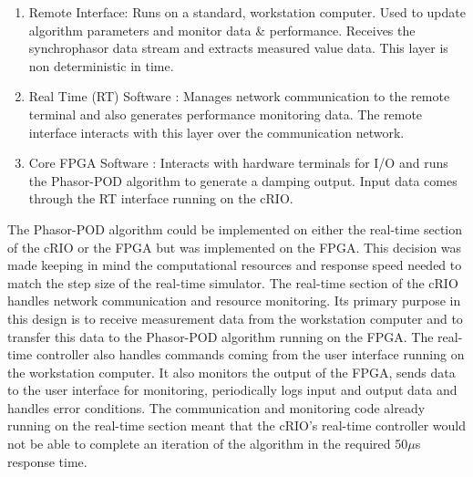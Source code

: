 \documentclass[journal]{IEEEtran}
\begin{document}
\begin{enumerate}
\item Remote Interface: Runs on a standard, workstation computer. Used to update algorithm parameters and monitor data \& performance. Receives the synchrophasor data stream and extracts measured value data. This  layer is non deterministic in time.

\item Real Time (RT) Software : Manages network communication to the remote terminal and also generates performance monitoring data. The remote interface interacts with this layer over the communication network.

\item Core FPGA Software : Interacts with hardware terminals for I/O and runs the Phasor-POD algorithm to generate a damping output. Input data comes through the RT interface running on the cRIO.

\end{enumerate}

The Phasor-POD algorithm could be implemented on either the real-time section of the cRIO or the FPGA but was implemented on the FPGA. This decision was made keeping in mind the computational resources and response speed needed to match the step size of the real-time simulator. The real-time section of the cRIO handles network communication and resource monitoring. Its primary purpose in this design is to receive measurement data from the workstation computer and to transfer this data to the Phasor-POD algorithm running on the FPGA. The real-time controller also handles commands coming from the user interface running on the workstation computer.  It also monitors the output of the FPGA, sends data to the user interface for monitoring, periodically logs input and output data and handles error conditions. The communication and monitoring code already running on the real-time section meant that the cRIO\rq{s} real-time controller would not be able to complete an iteration of the algorithm in the required 50$\mu$s response time. \\
\end{document}
